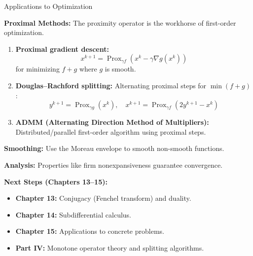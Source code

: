 \documentclass[aspectratio=169,10pt]{beamer}
\newcommand{\Prox}{\operatorname{Prox}}
\begin{document}
\begin{frame}[allowframebreaks]{Applications to Optimization}

  \textbf{Proximal Methods:} The proximity operator is the workhorse of
  first-order optimization.

  \begin{enumerate}
    \item \textbf{Proximal gradient descent:}
    \[
      x^{k+1} = \Prox_{\gamma f}(x^k - \gamma \nabla g(x^k))
    \]
    for minimizing $f + g$ where $g$ is smooth.

    \vspace{0.3cm}

    \item \textbf{Douglas--Rachford splitting:} Alternating proximal steps
    for $\min(f + g)$:
    \[
      y^{k+1} = \Prox_{\gamma g}(x^k), \quad x^{k+1} = \Prox_{\gamma f}(2y^{k+1} - x^k)
    \]

    \vspace{0.3cm}

    \item \textbf{ADMM (Alternating Direction Method of Multipliers):}
    Distributed/parallel first-order algorithm using proximal steps.
  \end{enumerate}

  \framebreak

  \textbf{Smoothing:} Use the Moreau envelope to smooth non-smooth functions.

  \vspace{0.5cm}

  \textbf{Analysis:} Properties like firm nonexpansiveness guarantee convergence.

  \vspace{1cm}

  \textbf{Next Steps (Chapters 13--15):}
  \begin{itemize}
    \item \textbf{Chapter 13:} Conjugacy (Fenchel transform) and duality.
    \item \textbf{Chapter 14:} Subdifferential calculus.
    \item \textbf{Chapter 15:} Applications to concrete problems.
    \item \textbf{Part IV:} Monotone operator theory and splitting algorithms.
  \end{itemize}

\end{frame}
\end{document}

